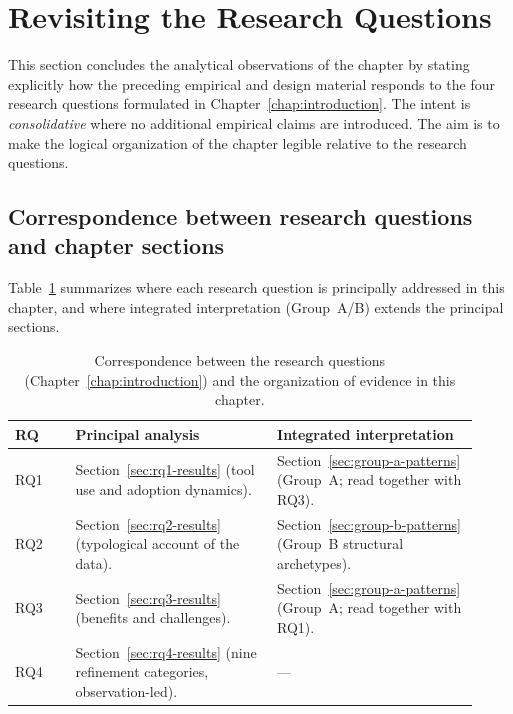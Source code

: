 \section{Revisiting the Research Questions}
\label{sec:rq-revisit}

This section concludes the analytical observations of the chapter by stating explicitly how
the preceding empirical and design material responds to the four research questions
formulated in Chapter~\ref{chap:introduction}. The intent is \emph{consolidative} where
no additional empirical claims are introduced. The aim is to make the logical
organization of the chapter legible relative to the research questions.

\subsection{Correspondence between research questions and chapter sections}

Table~\ref{tab:rq-chapter-map} summarizes where each research question is principally
addressed in this chapter, and where integrated interpretation (Group~A/B) extends
the principal sections.

\begin{table}[htbp]
\centering
\small
\setlength{\tabcolsep}{5pt}
\caption{Correspondence between the research questions (Chapter~\ref{chap:introduction})
  and the organization of evidence in this chapter.}
\label{tab:rq-chapter-map}
\begin{tabular}{p{0.12\linewidth} p{0.40\linewidth} p{0.40\linewidth}}
\toprule
\textbf{RQ} & \textbf{Principal analysis} & \textbf{Integrated interpretation} \\
\midrule
RQ1 & Section~\ref{sec:rq1-results} (tool use and adoption dynamics). &
Section~\ref{sec:group-a-patterns} (Group~A; read together with RQ3). \\
\midrule
RQ2 & Section~\ref{sec:rq2-results} (typological account of the data). &
Section~\ref{sec:group-b-patterns} (Group~B structural archetypes). \\
\midrule
RQ3 & Section~\ref{sec:rq3-results} (benefits and challenges). &
Section~\ref{sec:group-a-patterns} (Group~A; read together with RQ1). \\
\midrule
RQ4 & Section~\ref{sec:rq4-results} (nine refinement categories, observation-led). &
--- \\
\bottomrule
\end{tabular}
\end{table}

